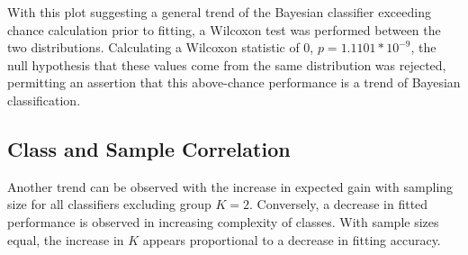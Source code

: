 \documentclass[10pt, conference]{IEEEtran}
\begin{document}
With this plot suggesting a general trend of the Bayesian classifier exceeding chance calculation prior to fitting, a Wilcoxon test was performed between the two distributions. Calculating a Wilcoxon statistic of 0, $p=1.1101*10^{-9}$,  the null hypothesis that these values come from the same distribution  was rejected, permitting an assertion that this above-chance performance is a trend of Bayesian classification. 

\subsection{Class and Sample Correlation}
Another trend can be observed with the increase in expected gain with sampling size for all classifiers excluding group $K=2$. Conversely, a decrease in fitted performance is observed in increasing complexity of classes. With sample sizes equal, the increase in $K$ appears proportional to a decrease in fitting accuracy. 
\end{document}
